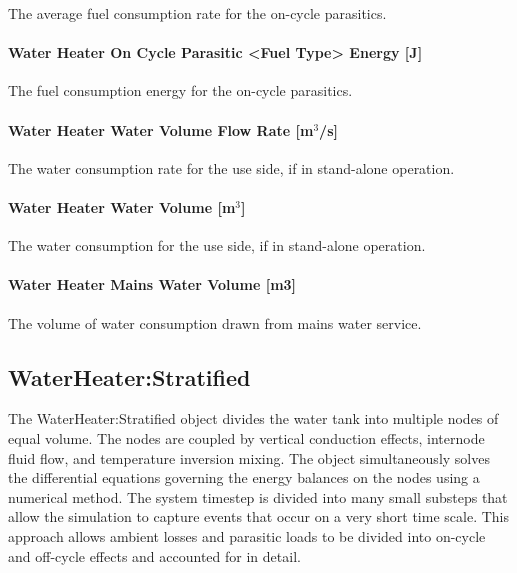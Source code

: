 The average fuel consumption rate for the on-cycle parasitics.

\paragraph{Water Heater On Cycle Parasitic \textless{}Fuel Type\textgreater{} Energy {[}J{]}}\label{water-heater-on-cycle-parasitic-fuel-type-energy-j}

The fuel consumption energy for the on-cycle parasitics.

\paragraph{Water Heater Water Volume Flow Rate {[}m\(^{3}\)/s{]}}\label{water-heater-water-volume-flow-rate-m3s}

The water consumption rate for the use side, if in stand-alone operation.

\paragraph{Water Heater Water Volume {[}m\(^{3}\){]}}\label{water-heater-water-volume-m3}

The water consumption for the use side, if in stand-alone operation.

\paragraph{Water Heater Mains Water Volume {[}m3{]}}\label{water-heater-mains-water-volume-m3}

The volume of water consumption drawn from mains water service.

\subsection{WaterHeater:Stratified}\label{waterheaterstratified}

The WaterHeater:Stratified object divides the water tank into multiple nodes of equal volume. The nodes are coupled by vertical conduction effects, internode fluid flow, and temperature inversion mixing. The object simultaneously solves the differential equations governing the energy balances on the nodes using a numerical method. The system timestep is divided into many small substeps that allow the simulation to capture events that occur on a very short time scale. This approach allows ambient losses and parasitic loads to be divided into on-cycle and off-cycle effects and accounted for in detail.

